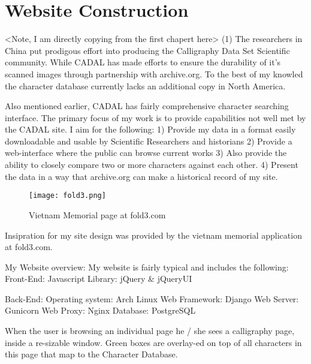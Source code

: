 \chapter{Website Construction}

    <Note, I am directly copying from the first chapert here>
    (1)  The researchers in China put prodigous effort into producing the Calligraphy Data Set Scientific community.  While CADAL has made efforts to ensure the durability of it's scanned images through partnership with archive.org.  To the best of my knowled the character database currently lacks an additional copy in North America.
    
    Also mentioned earlier, CADAL has fairly comprehensive character searching interface.  The primary focus of my work is to provide capabilities not well met by the CADAL site.  I aim for the following:
    1)  Provide my data in a format easily downloadable and usable by Scientific Researchers and historians
    2)  Provide a web-interface where the public can browse current works
    3)  Also provide the ability to closely compare two or more characters against each other.
    4)  Present the data in a way that archive.org can make a historical record of my site.
    
    
    
    
    
    
    
    
    \begin{figure}{}
    \parbox{12cm}{\texttt{[image: fold3.png]}}
    \caption{Vietnam Memorial page at fold3.com}
    \label{Vietnam Memorial inspiration}
    \end{figure}
    
    Insipration for my site design was provided by the vietnam memorial application at fold3.com.  
    
        My Website overview:
            My website is fairly typical and includes the following:
                Front-End:  Javascript Library: jQuery \& jQueryUI
                
                Back-End:   Operating system:   Arch Linux
                            Web Framework:      Django
                            Web Server:         Gunicorn
                            Web Proxy:          Nginx
                            Database:           PostgreSQL
                
            When the user is browsing an individual page he / she sees a calligraphy page, inside a re-sizable window.
                Green boxes are overlay-ed on top of all characters in this page that map to the Character Database.
                
